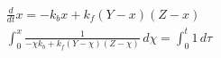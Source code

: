 \begin{align}
  \frac{d}{d t} x = - k_{b} x + k_{f} \left(Y - x\right) \left(Z - x\right) \\
  \int_{0}^{x} \frac{1}{- \chi k_{b} + k_{f} \left(Y - \chi\right) \left(Z - \chi\right)}\, d\chi = \int_{0}^{t} 1\, d\tau
\end{align}

